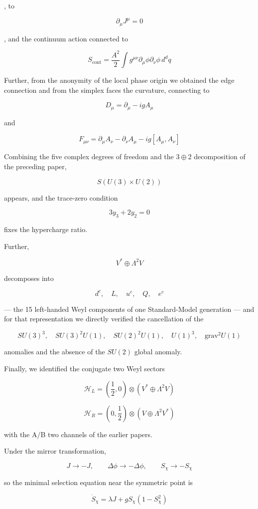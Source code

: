 \documentclass[
  a4paper,
]{article}
\begin{document}
, to

\[
\partial_\mu J^\mu=0
\]

, and the continuum action connected to

\[
S_{\mathrm{cont}}
=
\frac{A^2}{2}
\int
g^{\mu\nu}
\partial_\mu\phi
\partial_\nu\phi
\,d^dq
\]

Further, from the anonymity of the local phase origin we obtained the
edge connection and from the simplex faces the curvature, connecting to

\[
D_\mu
=
\partial_\mu-igA_\mu
\]

and

\[
F_{\mu\nu}
=
\partial_\mu A_\nu-\partial_\nu A_\mu-ig[A_\mu,A_\nu]
\]

Combining the five complex degrees of freedom and the \(3\oplus2\)
decomposition of the preceding paper,

\[
S(U(3)\times U(2))
\]

appears, and the trace-zero condition

\[
3y_3+2y_2=0
\]

fixes the hypercharge ratio.

Further,

\[
V^*\oplus\Lambda^2V
\]

decomposes into

\[
d^c,\quad L,\quad u^c,\quad Q,\quad e^c
\]

--- the 15 left-handed Weyl components of one Standard-Model generation
--- and for that representation we directly verified the cancellation of
the

\[
SU(3)^3,
\quad
SU(3)^2U(1),
\quad
SU(2)^2U(1),
\quad
U(1)^3,
\quad
\mathrm{grav}^2U(1)
\]

anomalies and the absence of the \(SU(2)\) global anomaly.

Finally, we identified the conjugate two Weyl sectors

\[
\mathcal H_L
=
\left(\frac12,0\right)
\otimes
(V^*\oplus\Lambda^2V)
\]

\[
\mathcal H_R
=
\left(0,\frac12\right)
\otimes
(V\oplus\Lambda^2V^*)
\]

with the A/B two channels of the earlier papers.

Under the mirror transformation,

\[
J\to-J,
\qquad
\Delta\phi\to-\Delta\phi,
\qquad
S_\chi\to-S_\chi
\]

so the minimal selection equation near the symmetric point is

\[
\boxed{
\dot S_\chi
=
\lambda J
+
gS_\chi(1-S_\chi^2)
}
\]
\end{document}
